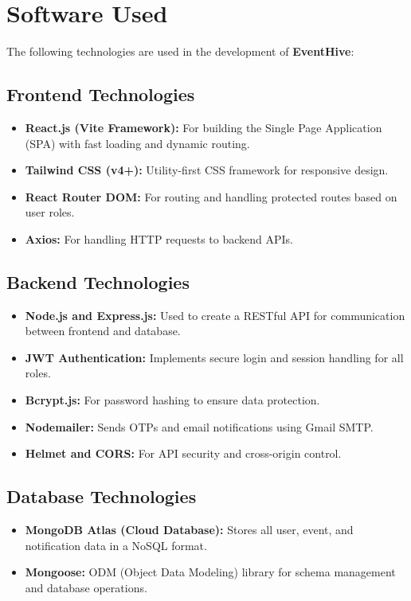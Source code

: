 \documentclass[12pt,a4paper]{report}
\begin{document}
\section{Software Used}

The following technologies are used in the development of \textbf{EventHive}:

\subsection*{Frontend Technologies}
\begin{itemize}
    \item \textbf{React.js (Vite Framework):} For building the Single Page Application (SPA) with fast loading and dynamic routing.
    \item \textbf{Tailwind CSS (v4+):} Utility-first CSS framework for responsive design.
    \item \textbf{React Router DOM:} For routing and handling protected routes based on user roles.
    \item \textbf{Axios:} For handling HTTP requests to backend APIs.
\end{itemize}

\subsection*{Backend Technologies}
\begin{itemize}
    \item \textbf{Node.js and Express.js:} Used to create a RESTful API for communication between frontend and database.
    \item \textbf{JWT Authentication:} Implements secure login and session handling for all roles.
    \item \textbf{Bcrypt.js:} For password hashing to ensure data protection.
    \item \textbf{Nodemailer:} Sends OTPs and email notifications using Gmail SMTP.
    \item \textbf{Helmet and CORS:} For API security and cross-origin control.
\end{itemize}

\subsection*{Database Technologies}
\begin{itemize}
    \item \textbf{MongoDB Atlas (Cloud Database):} Stores all user, event, and notification data in a NoSQL format.
    \item \textbf{Mongoose:} ODM (Object Data Modeling) library for schema management and database operations.
\end{itemize}
\end{document}
